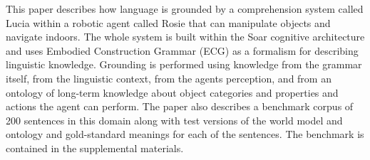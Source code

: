 This paper describes how language is grounded by a comprehension system called Lucia within a robotic agent called Rosie that can manipulate objects and navigate indoors. The whole system is built within the Soar cognitive architecture and uses Embodied Construction Grammar (ECG) as a formalism for describing linguistic knowledge. Grounding is performed using knowledge from the grammar itself, from the linguistic context, from the agents perception, and from an ontology of long-term knowledge about object categories and properties and actions the agent can perform. The paper also describes a benchmark corpus of 200 sentences in this domain along with test versions of the world model and ontology and gold-standard meanings for each of the sentences. The benchmark is contained in the supplemental materials.
